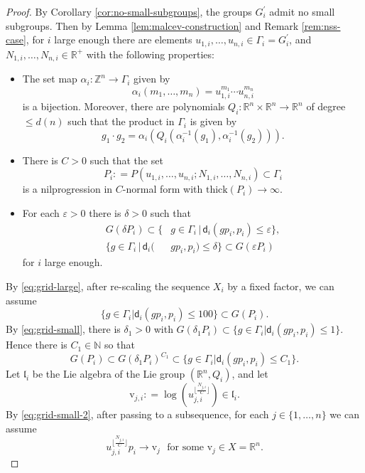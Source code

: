 \documentclass[12pt]{amsart}
\theoremstyle{definition}
\numberwithin{equation}{section}
\newcommand{\vv}{\text{v}}
\newcommand{\thi}{\text{thick}}
\begin{document}
\begin{proof}
 By Corollary \ref{cor:no-small-subgroups}, the groups $G_i^{\prime}$ admit no small subgroups. Then by Lemma \ref{lem:malcev-construction} and Remark \ref{rem:nss-case}, for $i$ large enough there are elements $u_{1,i}, \ldots , u_{n,i} \in \Gamma_i  = G_ i ^{\prime }$, and $N_{1,i}, \ldots , N_{n,i} \in \mathbb{R}^+$ with the following properties:
    \begin{itemize}
        \item The set map $ \alpha _i : \mathbb{Z}^n \to \Gamma  _i$ given by 
        \[  \alpha_i (m_1 , \ldots , m_n) = u_{1,i}^{m_1}\cdots u_{n,i}^{m_n}       \]
        is a bijection.  Moreover, there are polynomials $Q_i : \mathbb {R}^n \times \mathbb{R}^n\to \mathbb{R}^n$ of degree $\leq d(n)$ such that the product in $\Gamma_i$ is given by 
        \[g_1 \cdot g_2 = \alpha _i  ( Q_i ( \alpha _i ^{-1} (g_1) , \alpha _i  ^{-1} (g_2) )  ).  \]\label{property:zamora-1}
        \item There is $C > 0 $ such that the set
        \[  
            P_i : = P (  u_{1,i}, \ldots , u_{n,i} ; N_{1,i}, \ldots , N_{n,i} )  \subset  \Gamma _ i 
        \]  
        is a nilprogression in $C$-normal form with $\thi (P_i ) \to \infty $.  \label{property:zamora-3}
        \item  \label{property:zamora-4} For each $\varepsilon > 0 $ there is $\delta > 0 $ such that 
        \begin{align}
    G( \delta  P_ i  )    \subset  \{ & g \in \Gamma_i \, \vert \, \mathsf{d}_i(g p_i, p_i ) \leq \varepsilon \} ,  \label{eq:grid-small} \\
    \{ g \in  \Gamma_i  \, \vert  \, \mathsf{d}_i( & g p_i , p_i ) \leq \delta \}  \subset     G( \varepsilon  P_i  ) \label{eq:grid-large} 
 \end{align}
 for $i$ large enough.    
    \end{itemize}
By  \eqref{eq:grid-large}, after re-scaling the sequence $X_i$ by a fixed factor, we can assume 
\begin{equation} 
\{ g \in \Gamma _i \vert \mathsf{d} _i (gp_i, p_i) \leq 100 \} \subset G(P_i) . \label{eq:grid-large-2}    
\end{equation}
By  \eqref{eq:grid-small}, there is $\delta_1 > 0 $ with $G(\delta_1 P_i) \subset \{ g \in \Gamma _i \vert \mathsf{d}_i(gp_i,p_i) \leq 1 \} $. Hence there is $C_1 \in \mathbb{N} $ so that 
\begin{equation} \label{eq:grid-small-2}
G(P_i) \subset  G(\delta_1  P_i) ^{C_1} \subset   \{ g \in \Gamma _i \vert \mathsf{d}_i(gp_i, p_i) \leq C_1 \} .   
\end{equation}
Let $\mathfrak{l} _ i $ be the Lie algebra of the Lie group $(\mathbb{R}^n, Q_i )$, and let 
\[ \vv_{j,i} : = \log \left( u_{j,i}^{\lfloor \frac{N_{j,i}}{C}\rfloor }  \right) \in \mathfrak{l}_i  .  \]
By  \eqref{eq:grid-small-2}, after passing to a subsequence, for each $j \in \{ 1, \ldots , n \}$ we can assume
\[    u_{j,i}^{ \lfloor \frac{N_{j,i}}{C}\rfloor  } p_i \to \vv_j \, \, \text{ for some }\vv_j \in X = \mathbb{R}^n.  \]


\end{proof}
\end{document}
